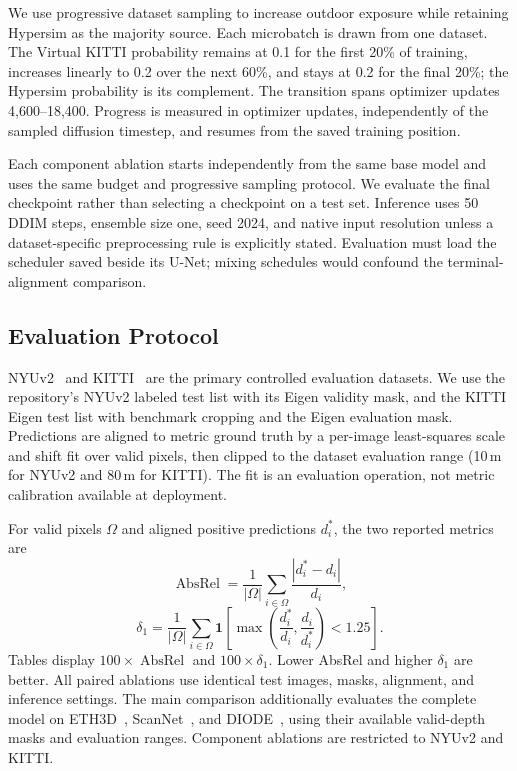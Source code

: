 \documentclass[10pt,journal,a4paper]{IEEEtran}
\begin{document}
We use progressive dataset sampling to increase outdoor exposure while retaining Hypersim as the majority source. Each microbatch is drawn from one dataset. The Virtual KITTI probability remains at 0.1 for the first 20\% of training, increases linearly to 0.2 over the next 60\%, and stays at 0.2 for the final 20\%; the Hypersim probability is its complement. The transition spans optimizer updates 4,600--18,400. Progress is measured in optimizer updates, independently of the sampled diffusion timestep, and resumes from the saved training position.

Each component ablation starts independently from the same base model and uses the same budget and progressive sampling protocol. We evaluate the final checkpoint rather than selecting a checkpoint on a test set. Inference uses 50 DDIM steps, ensemble size one, seed 2024, and native input resolution unless a dataset-specific preprocessing rule is explicitly stated. Evaluation must load the scheduler saved beside its U-Net; mixing schedules would confound the terminal-alignment comparison.

\subsection{Evaluation Protocol}
\label{sec:protocol}
NYUv2~\cite{silberman2012indoor} and KITTI~\cite{geiger2013vision} are the primary controlled evaluation datasets. We use the repository's NYUv2 labeled test list with its Eigen validity mask, and the KITTI Eigen test list with benchmark cropping and the Eigen evaluation mask. Predictions are aligned to metric ground truth by a per-image least-squares scale and shift fit over valid pixels, then clipped to the dataset evaluation range (10\,m for NYUv2 and 80\,m for KITTI). The fit is an evaluation operation, not metric calibration available at deployment.

For valid pixels $\Omega$ and aligned positive predictions $d_i^*$, the two reported metrics are
\begin{equation}
	\operatorname{AbsRel}=\frac{1}{|\Omega|}
	\sum_{i\in\Omega}\frac{|d_i^*-d_i|}{d_i},
\end{equation}
\begin{equation}
	\delta_1=\frac{1}{|\Omega|}\sum_{i\in\Omega}
	\mathbf1\!\left[\max\left(\frac{d_i^*}{d_i},\frac{d_i}{d_i^*}\right)<1.25\right].
\end{equation}
Tables display $100\times\operatorname{AbsRel}$ and $100\times\delta_1$. Lower AbsRel and higher $\delta_1$ are better. All paired ablations use identical test images, masks, alignment, and inference settings. The main comparison additionally evaluates the complete model on ETH3D~\cite{schops2017multi}, ScanNet~\cite{dai2017scannet}, and DIODE~\cite{vasiljevic2019diode}, using their available valid-depth masks and evaluation ranges. Component ablations are restricted to NYUv2 and KITTI.
\end{document}
